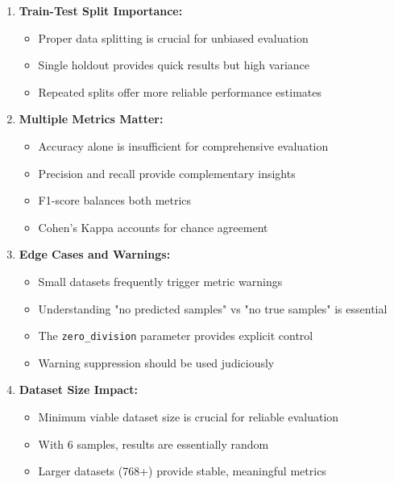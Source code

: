 \documentclass[12pt,a4paper]{article}
\begin{document}
\begin{enumerate}
    \item \textbf{Train-Test Split Importance:}
    \begin{itemize}
        \item Proper data splitting is crucial for unbiased evaluation
        \item Single holdout provides quick results but high variance
        \item Repeated splits offer more reliable performance estimates
    \end{itemize}

    \item \textbf{Multiple Metrics Matter:}
    \begin{itemize}
        \item Accuracy alone is insufficient for comprehensive evaluation
        \item Precision and recall provide complementary insights
        \item F1-score balances both metrics
        \item Cohen's Kappa accounts for chance agreement
    \end{itemize}

    \item \textbf{Edge Cases and Warnings:}
    \begin{itemize}
        \item Small datasets frequently trigger metric warnings
        \item Understanding "no predicted samples" vs "no true samples" is essential
        \item The \texttt{zero\_division} parameter provides explicit control
        \item Warning suppression should be used judiciously
    \end{itemize}

    \item \textbf{Dataset Size Impact:}
    \begin{itemize}
        \item Minimum viable dataset size is crucial for reliable evaluation
        \item With 6 samples, results are essentially random
        \item Larger datasets (768+) provide stable, meaningful metrics
    \end{itemize}
\end{enumerate}
\end{document}
